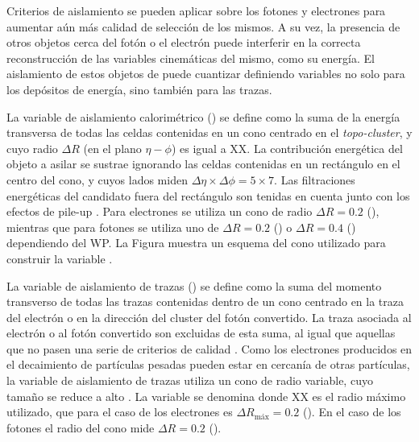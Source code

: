 Criterios de aislamiento se pueden aplicar sobre los fotones y electrones para aumentar aún más calidad de selección de los mismos. A su vez, la presencia de otros objetos cerca del fotón o el electrón puede interferir en la correcta reconstrucción de las variables cinemáticas del mismo, como su energía. El aislamiento de estos objetos de puede cuantizar definiendo variables no solo para los depósitos de energía, sino también para las trazas.

La variable de aislamiento calorimétrico \cite{PERF-2017-01} () se define como la suma de la energía transversa de todas las celdas contenidas en un cono centrado en el \textit{topo-cluster}, y cuyo radio $\Delta R$  (en el plano $\eta-\phi$) es igual a XX. La contribución energética del objeto a asilar se sustrae ignorando las celdas contenidas en un rectángulo en el centro del cono, y cuyos lados miden $\Delta\eta\times\Delta\phi = 5 \times 7$. Las filtraciones energéticas del candidato fuera del rectángulo son tenidas en cuenta junto con los efectos de pile-up \cite{Cacciari}. Para electrones se utiliza un cono de radio $\Delta R = 0.2$ (), mientras que para fotones se utiliza uno de $\Delta R = 0.2$ () o $\Delta R = 0.4$ () dependiendo del WP. La Figura  muestra un esquema del cono utilizado para construir la variable .

La variable de aislamiento de trazas () se define como la suma del momento transverso de todas las trazas contenidas dentro de un cono centrado en la traza del electrón o en la dirección del cluster del fotón convertido. La traza asociada al electrón o al fotón convertido son excluidas de esta suma, al igual que aquellas que no pasen una serie de criterios de calidad . Como los electrones producidos en el decaimiento de partículas pesadas pueden estar en cercanía de otras partículas, la variable de aislamiento de trazas utiliza un cono de radio variable, cuyo tamaño se reduce a alto \pt. La variable se denomina  donde XX es el radio máximo utilizado, que para el caso de los electrones es $\Delta R_{\text{máx}} = 0.2$ (). En el caso de los fotones el radio del cono mide $\Delta R = 0.2$ ().

